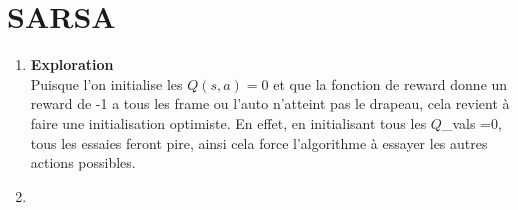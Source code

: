 \documentclass[letterpaper,11pt]{article}
\begin{document}
\section{SARSA}

\begin{enumerate}[label=(\alph*)]

\item \textbf{Exploration}\\
Puisque l'on initialise les $Q(s, a)=0$ et que la fonction de reward donne un reward de -1 a tous les frame ou l'auto n'atteint pas le drapeau, cela revient à faire une initialisation optimiste.
En effet, en initialisant tous les $Q$\_vals =0, tous les essaies feront pire, ainsi cela force l'algorithme à essayer les autres actions possibles.

\item

\end{enumerate}
\end{document}
